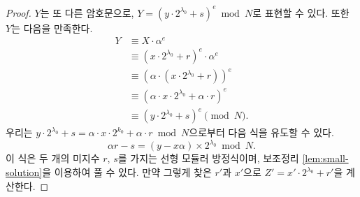 \begin{proof}
    $Y$는 또 다른 암호문으로, $Y = (y \cdot 2^{\lambda_0} + s)^e \bmod N$로
    표현할 수 있다. 또한 $Y$는 다음을 만족한다.
    \begin{align*}
        Y &\equiv X \cdot \alpha^e \\ 
        &\equiv (x \cdot 2^{\lambda_0} + r)^e \cdot \alpha^e \\
        &\equiv (\alpha \cdot (x \cdot 2^{\lambda_0} + r))^e \\
        &\equiv (\alpha \cdot x \cdot 2^{\lambda_0} + \alpha \cdot r)^e \\
        &\equiv (y \cdot 2^{\lambda_0} + s)^e \pmod N.
    \end{align*}
    우리는 $y \cdot 2^{\lambda_0} + s = \alpha \cdot x \cdot 2^{k_0} + \alpha \cdot r
    \bmod N$으로부터 다음 식을 유도할 수 있다.
    $$
        \alpha r - s = (y - x\alpha) \times 2^{\lambda_0} \bmod N.
    $$
    이 식은 두 개의 미지수 $r$, $s$를 가지는 선형 모듈러 방정식이며, 보조정리
    \ref{lem:small-solution}을 이용하여 풀 수 있다. 만약 그렇게 찾은 $r'$과
    $x'$으로 $Z' = x' \cdot 2^{\lambda_0} + r'$을 계산한다.
    

\end{proof}

    